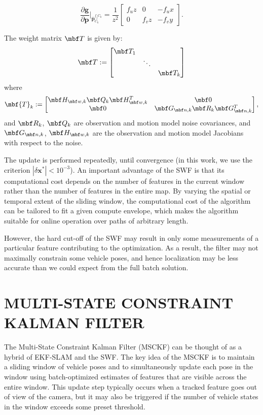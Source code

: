 \documentclass[letterpaper, 10 pt, conference]{ieeeconf}  %
\def\Vec#1{\mathbf{#1}}
\newcommand{\bbm}{\begin{bmatrix}}
\newcommand{\ebm}{\end{bmatrix}}
\newcommand{\pd}[2]{\frac{\partial #1}{\partial #2}}
\begin{document}
\begin{equation}
\pd{\Vec g}{ \Vec p}\Bigr|_{\bar{\Vec p}_{C_k}^{f_j C_k}} = \frac{1}{z^2} \bbm f_u z & 0 & - f_u x \\  0 & f_v z & -f_v y \ebm.
\end{equation}

The weight matrix $\mbf T$ is given by:
\begin{equation}
\mbf T := \bbm \mbf T_1 &  &  \\ 
 & \ddots &  \\
 & & \mbf T_k
\ebm 
\end{equation}
where
\begin{equation}
\mbf{T}_k := \bbm \mbf H_{\mbf w, k} \mbf Q_k \mbf H_{\mbf w, k}^T & \mbf 0 \\
\mbf 0 & \mbf G_{\mbf n, k} \mbf R_k \mbf G_{\mbf n, k}^T \ebm,
\end{equation}
and $\mbf R_k$, $\mbf Q_k$ are observation and motion model noise covariances, and $\mbf G_{\mbf n, k}$, $\mbf H_{\mbf w, k}$ are the observation and motion model Jacobians with respect to the noise.

The update is performed repeatedly, until convergence (in this work, we use the criterion $|\delta \Vec{x}^*| < 10^{-3} $). An important advantage of the SWF is that its computational cost depends on the number of features in the current window rather than the number of features in the entire map.
By varying the spatial or temporal extent of the sliding window, the computational cost of the algorithm can be tailored to fit a given compute envelope, which makes the algorithm suitable for online operation over paths of arbitrary length.

However, the hard cut-off of the SWF may result in only some measurements of a particular feature contributing to the optimization.
As a result, the filter may not maximally constrain some vehicle poses, and hence localization may be less accurate than we could expect from the full batch solution.

\section{MULTI-STATE CONSTRAINT KALMAN FILTER} \label{sec:MSCKF}
The Multi-State Constraint Kalman Filter (MSCKF) \cite{Mourikis:2006:TechReport,Mourikis:2007:ICRA} can be thought of as a hybrid of EKF-SLAM and the SWF.
The key idea of the MSCKF is to maintain a sliding window of vehicle poses and to simultaneously update each pose in the window using batch-optimized estimates of features that are visible across the entire window.
This update step typically occurs when a tracked feature goes out of view of the camera, but it may also be triggered if the number of vehicle states in the window exceeds some preset threshold.
\end{document}
